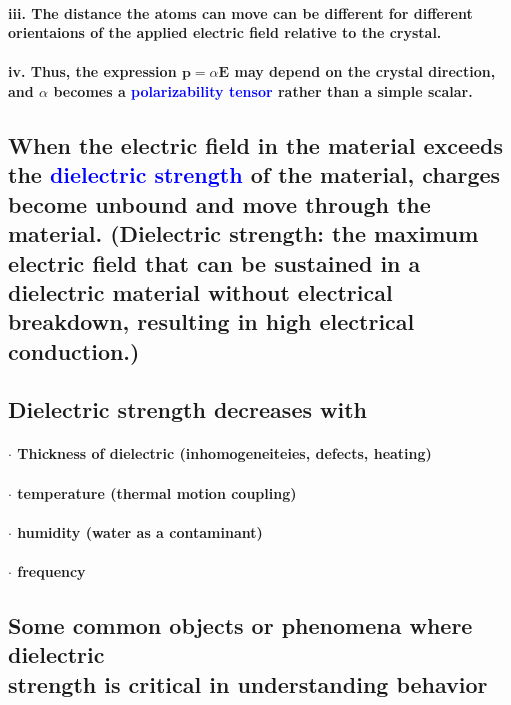 \documentclass{article}
\begin{document}
\paragraph{\indent iii. The distance the atoms can move can be different for different orientaions of the applied electric field relative to the crystal.}
\paragraph{\indent iv. Thus, the expression $\boldsymbol{p}=\alpha\boldsymbol{E}$ may depend on the crystal direction, and $\alpha$ becomes a \textcolor{blue}{polarizability tensor} rather than a simple scalar.}
\subsection{When the electric field in the material exceeds the \textcolor{blue}{dielectric strength} of the material, charges become unbound and move through the material. (Dielectric strength: the maximum electric field that can be sustained in a dielectric material without electrical breakdown, resulting in high electrical conduction.)}
\subsection{Dielectric strength decreases with}
\paragraph{\indent $\cdot$ Thickness of dielectric (inhomogeneiteies, defects, heating)}
\paragraph{\indent $\cdot$ temperature (thermal motion coupling)}
\paragraph{\indent $\cdot$ humidity (water as a contaminant)}
\paragraph{\indent $\cdot$ frequency}
\subsection{Some common objects or phenomena where dielectric\\ strength is critical in understanding behavior}
\end{document}
